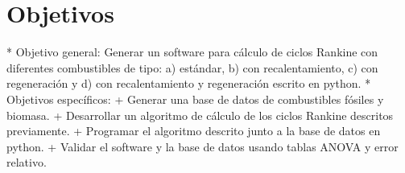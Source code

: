 
\chapter{Objetivos}%
\vspace{-35pt}
\begin{markdown}
* Objetivo general: Generar un software para cálculo de ciclos Rankine con diferentes combustibles de tipo: a) estándar, b) con recalentamiento, c) con regeneración y d) con recalentamiento y regeneración escrito en python.
* Objetivos específicos:
	+ Generar una base de datos de combustibles fósiles y biomasa.
	+ Desarrollar un algoritmo de cálculo de los ciclos Rankine descritos previamente.
	+ Programar el algoritmo descrito junto a la base de datos en python.
	+ Validar el software y la base de datos usando tablas ANOVA y error relativo.
\end{markdown}



